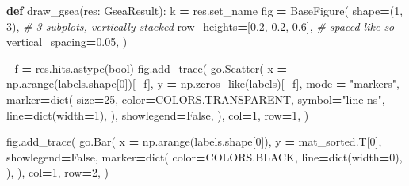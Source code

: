 \documentclass[
]{book}
\newenvironment{Shaded}{\begin{snugshade}}{\end{snugshade}}
\newcommand{\BuiltInTok}[1]{#1}
\newcommand{\CommentTok}[1]{\textcolor[rgb]{0.56,0.35,0.01}{\textit{#1}}}
\newcommand{\DecValTok}[1]{\textcolor[rgb]{0.00,0.00,0.81}{#1}}
\newcommand{\FloatTok}[1]{\textcolor[rgb]{0.00,0.00,0.81}{#1}}
\newcommand{\KeywordTok}[1]{\textcolor[rgb]{0.13,0.29,0.53}{\textbf{#1}}}
\newcommand{\NormalTok}[1]{#1}
\newcommand{\OperatorTok}[1]{\textcolor[rgb]{0.81,0.36,0.00}{\textbf{#1}}}
\newcommand{\StringTok}[1]{\textcolor[rgb]{0.31,0.60,0.02}{#1}}
\newcommand{\VariableTok}[1]{\textcolor[rgb]{0.00,0.00,0.00}{#1}}
\begin{document}
\begin{Shaded}
\begin{Highlighting}[numbers=left,,]
\KeywordTok{def}\NormalTok{ draw\_gsea(res: GseaResult):}
\NormalTok{    k }\OperatorTok{=}\NormalTok{ res.set\_name}
\NormalTok{    fig }\OperatorTok{=}\NormalTok{ BaseFigure(}
\NormalTok{        shape}\OperatorTok{=}\NormalTok{(}\DecValTok{1}\NormalTok{, }\DecValTok{3}\NormalTok{),                   }\CommentTok{\# 3 subplots, vertically stacked}
\NormalTok{        row\_heights}\OperatorTok{=}\NormalTok{[}\FloatTok{0.2}\NormalTok{, }\FloatTok{0.2}\NormalTok{, }\FloatTok{0.6}\NormalTok{],    }\CommentTok{\# spaced like so}
\NormalTok{        vertical\_spacing}\OperatorTok{=}\FloatTok{0.05}\NormalTok{,}
\NormalTok{    )}

\NormalTok{    \_f }\OperatorTok{=}\NormalTok{ res.hits.astype(}\BuiltInTok{bool}\NormalTok{)}
\NormalTok{    fig.add\_trace(}
\NormalTok{        go.Scatter(}
\NormalTok{            x }\OperatorTok{=}\NormalTok{ np.arange(labels.shape[}\DecValTok{0}\NormalTok{])[\_f],}
\NormalTok{            y }\OperatorTok{=}\NormalTok{ np.zeros\_like(labels)[\_f],}
\NormalTok{            mode }\OperatorTok{=} \StringTok{"markers"}\NormalTok{,}
\NormalTok{            marker}\OperatorTok{=}\BuiltInTok{dict}\NormalTok{(}
\NormalTok{                size}\OperatorTok{=}\DecValTok{25}\NormalTok{,}
\NormalTok{                color}\OperatorTok{=}\NormalTok{COLORS.TRANSPARENT,}
\NormalTok{                symbol}\OperatorTok{=}\StringTok{"line{-}ns"}\NormalTok{,}
\NormalTok{                line}\OperatorTok{=}\BuiltInTok{dict}\NormalTok{(width}\OperatorTok{=}\DecValTok{1}\NormalTok{),}
\NormalTok{            ),}
\NormalTok{            showlegend}\OperatorTok{=}\VariableTok{False}\NormalTok{,}
\NormalTok{        ),}
\NormalTok{        col}\OperatorTok{=}\DecValTok{1}\NormalTok{, row}\OperatorTok{=}\DecValTok{1}\NormalTok{,}
\NormalTok{    )}

\NormalTok{    fig.add\_trace(}
\NormalTok{        go.Bar(}
\NormalTok{            x }\OperatorTok{=}\NormalTok{ np.arange(labels.shape[}\DecValTok{0}\NormalTok{]),}
\NormalTok{            y }\OperatorTok{=}\NormalTok{ mat\_sorted.T[}\DecValTok{0}\NormalTok{],}
\NormalTok{            showlegend}\OperatorTok{=}\VariableTok{False}\NormalTok{,}
\NormalTok{            marker}\OperatorTok{=}\BuiltInTok{dict}\NormalTok{(}
\NormalTok{                color}\OperatorTok{=}\NormalTok{COLORS.BLACK,}
\NormalTok{                line}\OperatorTok{=}\BuiltInTok{dict}\NormalTok{(width}\OperatorTok{=}\DecValTok{0}\NormalTok{),}
\NormalTok{            ),}
\NormalTok{        ),}
\NormalTok{        col}\OperatorTok{=}\DecValTok{1}\NormalTok{, row}\OperatorTok{=}\DecValTok{2}\NormalTok{,}
\NormalTok{    )}


\end{Highlighting}
\end{Shaded}
\end{document}
